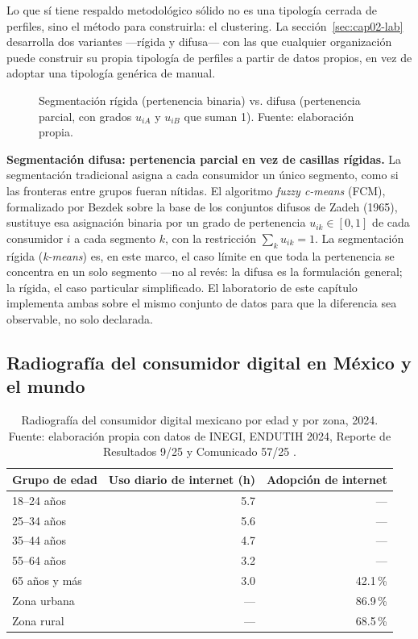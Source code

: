 Lo que sí tiene respaldo metodológico sólido no es una tipología cerrada de
perfiles, sino el método para construirla: el clustering. La
sección~\ref{sec:cap02-lab} desarrolla dos variantes —rígida y difusa— con
las que cualquier organización puede construir su propia tipología de
perfiles a partir de datos propios, en vez de adoptar una tipología genérica
de manual.

\begin{figure}[htbp]
  \centering
  
  \caption{Segmentación rígida (pertenencia binaria) vs. difusa (pertenencia
  parcial, con grados $u_{iA}$ y $u_{iB}$ que suman 1). Fuente: elaboración
  propia.}
  \label{fig:cap02-rigida-difusa}
\end{figure}

\begin{cajaFrontera}
\textbf{Segmentación difusa: pertenencia parcial en vez de casillas
rígidas.} La segmentación tradicional asigna a cada consumidor un único
segmento, como si las fronteras entre grupos fueran nítidas. El algoritmo
\textit{fuzzy c-means} (FCM), formalizado por Bezdek
\parencite{bezdek1981} sobre la base de los conjuntos difusos de Zadeh
(1965), sustituye esa asignación binaria por un grado de pertenencia
$u_{ik} \in [0,1]$ de cada consumidor $i$ a cada segmento $k$, con la
restricción $\sum_k u_{ik} = 1$. La segmentación rígida (\textit{k-means})
es, en este marco, el caso límite en que toda la pertenencia se concentra en
un solo segmento —no al revés: la difusa es la formulación general; la
rígida, el caso particular simplificado. El laboratorio de este capítulo
implementa ambas sobre el mismo conjunto de datos para que la diferencia sea
observable, no solo declarada.
\end{cajaFrontera}

\subsection{Radiografía del consumidor digital en México y el mundo}
\label{sec:cap02-radiografia}

\begin{table}[htbp]
\centering
\begin{tabular}{@{}lrr@{}}
\toprule
Grupo de edad & Uso diario de internet (h) & Adopción de internet \\
\midrule
18--24 años & 5.7 & — \\
25--34 años & 5.6 & — \\
35--44 años & 4.7 & — \\
55--64 años & 3.2 & — \\
65 años y más & 3.0 & 42.1\,\% \\
\midrule
Zona urbana & — & 86.9\,\% \\
Zona rural & — & 68.5\,\% \\
\bottomrule
\end{tabular}
\caption{Radiografía del consumidor digital mexicano por edad y por zona,
2024. Fuente: elaboración propia con datos de INEGI, ENDUTIH 2024, Reporte de
Resultados 9/25 y Comunicado 57/25 \parencite{inegi2025endutih}.}
\label{tab:cap02-radiografia}
\end{table}

